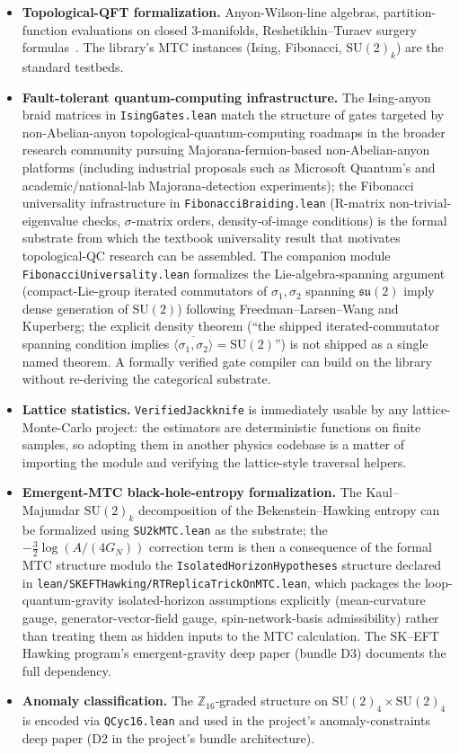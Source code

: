 \documentclass[11pt]{article}
\begin{document}
\begin{itemize}
\item \textbf{Topological-QFT formalization.} Anyon-Wilson-line
algebras, partition-function evaluations on closed 3-manifolds,
Reshetikhin--Turaev surgery formulas~\cite{turaev2010}. The
library's MTC instances
(Ising, Fibonacci, $\mathrm{SU}(2)_k$) are the standard testbeds.
\item \textbf{Fault-tolerant quantum-computing infrastructure.} The
Ising-anyon braid matrices in
\texttt{IsingGates.lean} match the structure of gates targeted by
non-Abelian-anyon topological-quantum-computing roadmaps in the
broader research community pursuing Majorana-fermion-based
non-Abelian-anyon platforms (including industrial proposals such
as Microsoft Quantum's and academic/national-lab
Majorana-detection experiments); the
Fibonacci universality infrastructure in
\texttt{FibonacciBraiding.lean} (R-matrix non-trivial-eigenvalue
checks, $\sigma$-matrix orders, density-of-image conditions) is
the formal substrate from which the textbook universality result
that motivates topological-QC research can be assembled. The
companion module \texttt{FibonacciUniversality.lean} formalizes
the Lie-algebra-spanning argument (compact-Lie-group iterated
commutators of $\sigma_1, \sigma_2$ spanning $\mathfrak{su}(2)$
imply dense generation of $\mathrm{SU}(2)$) following
Freedman--Larsen--Wang and Kuperberg; the explicit density
theorem (``the shipped iterated-commutator spanning condition
implies $\overline{\langle \sigma_1, \sigma_2 \rangle} = \mathrm{SU}(2)$'')
is not shipped as a single named theorem. A formally verified
gate compiler can build on the library without re-deriving the
categorical substrate.
\item \textbf{Lattice statistics.} \texttt{VerifiedJackknife} is
immediately usable by any lattice-Monte-Carlo project: the
estimators are deterministic functions on finite samples, so
adopting them in another physics codebase is a matter of importing
the module and verifying the lattice-style traversal helpers.
\item \textbf{Emergent-MTC black-hole-entropy formalization.} The
Kaul--Majumdar SU$(2)_k$ decomposition of the
Bekenstein--Hawking entropy can be formalized using
\texttt{SU2kMTC.lean} as the substrate; the
$-\frac{3}{2} \log(A/(4G_N))$ correction term is then a
consequence of the formal MTC structure modulo the
\texttt{IsolatedHorizonHypotheses} structure declared in
\texttt{lean/SKEFTHawking/RTReplicaTrickOnMTC.lean}, which
packages the loop-quantum-gravity isolated-horizon assumptions
explicitly (mean-curvature gauge, generator-vector-field gauge,
spin-network-basis admissibility) rather than treating them as
hidden inputs to the MTC calculation. The SK--EFT Hawking
program's emergent-gravity deep paper (bundle D3) documents the
full dependency.
\item \textbf{Anomaly classification.} The
$\mathbb{Z}_{16}$-graded structure on
$\mathrm{SU}(2)_4 \times \mathrm{SU}(2)_4$ is encoded via
\texttt{QCyc16.lean} and used in the project's anomaly-constraints
deep paper (D2 in the project's bundle architecture).
\end{itemize}
\end{document}
